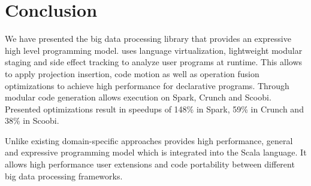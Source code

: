 \section{Conclusion}
\label{sec:conclusion}

We have presented the big data processing library \tool that provides an expressive high level programming model. \tool uses language virtualization, lightweight modular staging and side effect tracking to analyze user programs at runtime. This allows \tool to apply projection insertion, code motion as well as operation fusion optimizations to achieve high performance for declarative programs. Through modular code generation \tool allows execution on Spark, Crunch and Scoobi. Presented optimizations result in speedups of 148\% in Spark, 59\% in Crunch and 38\% in Scoobi.   

Unlike existing domain-specific approaches \tool provides high performance,
general and expressive programming model which is integrated into the Scala language. It allows high performance user extensions and code portability between different big data processing frameworks.

